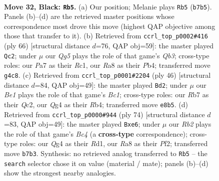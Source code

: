\documentclass[11pt]{article}
\begin{document}
\clearpage

\begin{figure}[p]\centering
\begin{subfigure}{0.46\textwidth}\centering
\resizebox{\linewidth}{!}{%
\newchessgame
\chessboard[
  setfen={r3b1k1/pr3pP1/8/p7/2N1p1q1/PP6/1Q3P1K/R3R3 b - - 4 32},
  showmover=false,
  pgfstyle=straightmove, color=movearrow, markmove={b7-b5}
]}
\caption{}
\end{subfigure}\hfill
\begin{subfigure}{0.46\textwidth}\centering
\resizebox{\linewidth}{!}{%
\newchessgame
\chessboard[
  setfen={8/2r2r1k/1p2q2p/4pp2/1PP1p3/1Q4P1/4P2P/2R2R1K w - - 2 34},
  showmover=false,
  pgfstyle=straightmove, color=movearrow, markmove={b3-c2}
]}
\caption{}
\end{subfigure}
\\[4pt]
\begin{subfigure}{0.46\textwidth}\centering
\resizebox{\linewidth}{!}{%
\newchessgame
\chessboard[
  setfen={2r4r/p1qn1pk1/1p4p1/P3p3/1R6/2P4P/2Q2PP1/R1B3K1 w - - 0 24},
  showmover=false,
  pgfstyle=straightmove, color=movearrow, markmove={c1-d2}
]}
\caption{}
\end{subfigure}\hfill
\begin{subfigure}{0.46\textwidth}\centering
\resizebox{\linewidth}{!}{%
\newchessgame
\chessboard[
  setfen={3r1q2/1Q1P1rpk/p3p2p/P4p2/2B5/7P/5PP1/3R2K1 w - - 1 38},
  showmover=false,
  pgfstyle=straightmove, color=movearrow, markmove={c4-e6}
]}
\caption{}
\end{subfigure}
\caption{\textbf{Move 32, Black: \texttt{Rb5}.} (a) Our position; Melanie plays \texttt{Rb5} (\texttt{b7b5}). Panels (b)--(d) are the retrieved master positions whose correspondence most drove this move (highest QAP objective among those that transfer to it). (b) Retrieved from \texttt{ccrl\_top\_p0002\#416} (ply 66) [structural distance $d$=76, QAP obj=59]: the master played \texttt{Qc2}; under $\mu$ our \emph{Qg5} plays the role of that game's \emph{Qb3}; cross-type roles: our \emph{P}a7 as their \emph{R}c1, our \emph{R}a8 as their \emph{P}b4; transferred move \texttt{g4c8}. (c) Retrieved from \texttt{ccrl\_top\_p0001\#2204} (ply 46) [structural distance $d$=84, QAP obj=49]: the master played \texttt{Bd2}; under $\mu$ our \emph{Be1} plays the role of that game's \emph{Bc1}; cross-type roles: our \emph{R}b7 as their \emph{Q}c2, our \emph{Q}g4 as their \emph{R}b4; transferred move \texttt{e8b5}. (d) Retrieved from \texttt{ccrl\_top\_p0000\#944} (ply 74) [structural distance $d$=83, QAP obj=49]: the master played \texttt{Bxe6}; under $\mu$ our \emph{Rb2} plays the role of that game's \emph{Bc4} (a \textbf{cross-type} correspondence); cross-type roles: our \emph{Q}g4 as their \emph{R}d1, our \emph{R}a8 as their \emph{P}f2; transferred move \texttt{b7b3}. Synthesis: no retrieved analog transferred to \texttt{Rb5} -- the \texttt{search} selector chose it on value (material / mate); panels (b)--(d) show the strongest nearby analogies.}
\label{fig:thought-m63}
\end{figure}
\end{document}
